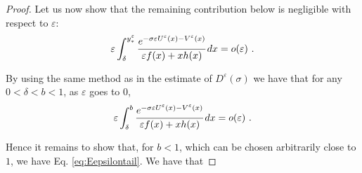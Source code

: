 \documentclass[reqno, 12pt, a4paper]{amsart}
\theoremstyle{plain}
\theoremstyle{definition}
\begin{document}
\begin{proof}
\bigskip


Let us now show that the remaining contribution below is negligible with respect to $\varepsilon$:
\begin{equation}
\label{eq:Eepsilontail}
\begin{split}
\varepsilon \int_\delta^{y_*^\varepsilon} \cfrac{e^{-\sigma \varepsilon U^\varepsilon (x) - V^\varepsilon (x) }}{\varepsilon f(x) +x h(x)} \, dx = o(\varepsilon) \ .
\end{split}
\end{equation}

\bigskip

By using the same method as in the estimate of $D^\varepsilon (\sigma)$ we have that for any $0<\delta<b<1$, as $\varepsilon$ goes to $0$,
\begin{equation}
\begin{split}
\varepsilon \int_\delta^{b} \cfrac{e^{-\sigma \varepsilon U^\varepsilon (x) - V^\varepsilon (x) }}{\varepsilon f(x) +x h(x)} \, dx = o(\varepsilon) \ . 
\end{split}
\end{equation}

\bigskip

Hence it remains to show that, for $b<1$, which can be chosen arbitrarily close to $1$, we have Eq. \eqref{eq:Eepsilontail}. We have that


\end{proof}
\end{document}
